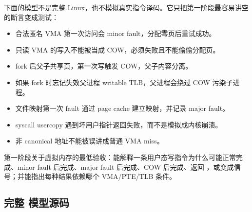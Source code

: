 下面的模型不是完整 Linux，也不模拟真实指令译码。它只把第一阶段最容易讲空的断言变成测试：

\begin{itemize}
\tightlist
\item 合法匿名 VMA 第一次访问会 minor fault，分配零页后重试成功。
\item 只读 VMA 的写入不能被当成 COW，必须失败且不能偷偷分配页。
\item fork 后父子共享页，第一次写触发 COW，父子内容分离。
\item 如果 fork 时忘记失效父进程 writable TLB，父进程会绕过 COW 污染子进程。
\item 文件映射第一次 fault 通过 page cache 建立映射，并记录 major fault。
\item syscall usercopy 遇到坏用户指针返回失败，而不是模拟成内核崩溃。
\item 非 canonical 地址不能被误讲成普通 VMA miss。
\end{itemize}

\begin{rubricbox}
第一阶段关于虚拟内存的最低验收：能解释一条用户态写指令为什么可能正常完成、minor fault 后完成、major fault 后完成、COW 后完成、返回 ，或变成信号；并能指出每种结果依赖哪个 VMA/PTE/TLB 条件。
\end{rubricbox}

\subsection{完整  模型源码}


